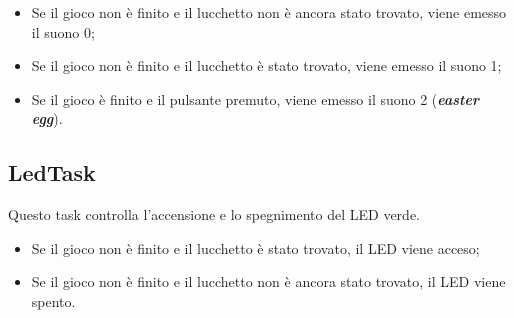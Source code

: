 \begin{itemize}
	\item Se il gioco non è finito e il lucchetto non è ancora stato trovato, viene emesso il suono 0;
	\item Se il gioco non è finito e il lucchetto è stato trovato, viene emesso il suono 1;
	\item Se il gioco è finito e il pulsante premuto, viene emesso il suono 2 (\textbf{\textit{easter egg}}).
\end{itemize}

\subsection{LedTask}
Questo task controlla l'accensione e lo spegnimento del LED verde.

\begin{itemize}
	\item Se il gioco non è finito e il lucchetto è stato trovato, il LED viene acceso;
	\item Se il gioco non è finito e il lucchetto non è ancora stato trovato, il LED viene spento.
\end{itemize}


